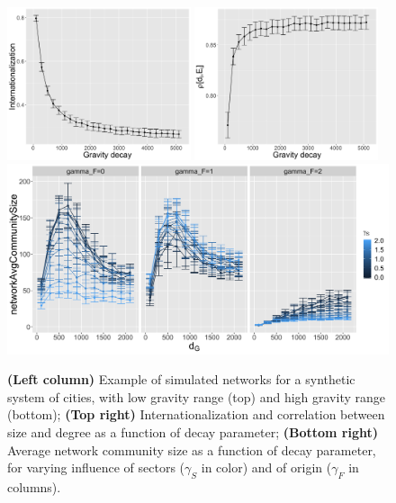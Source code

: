\documentclass[10pt,letterpaper]{article}
\begin{document}
\begin{figure}
\begin{center}
\begin{minipage}[c]{0.25\textwidth}
    \end{minipage}
    \begin{minipage}[c]{0.6\linewidth}
     \includegraphics[width=0.48\textwidth]{figures/internationalization-gravityDecay_errorbars.png}
    \includegraphics[width=0.48\textwidth]{figures/rhoDegreeSize-gravityDecay_errorbars.png}\\
    \includegraphics[width=\textwidth]{figures/networkAvgCommunitySize_countryGravityDecay2100_gammaDestination0_facetwrapgammaOrigin_colorgammaSectors.png}
    \end{minipage}
    \end{center}
    \vspace{-0.5cm}
    \caption{\footnotesize\textbf{(Left column)} Example of simulated networks for a synthetic system of cities, with low gravity range (top) and high gravity range (bottom); \textbf{(Top right)} Internationalization and correlation between size and degree as a function of decay parameter; \textbf{(Bottom right)} Average network community size as a function of decay parameter, for varying influence of sectors ($\gamma_S$ in color) and of origin ($\gamma_F$ in columns).}
\end{figure}


\footnotesize


\begin{multicols}{2}




\end{multicols}
\end{document}
